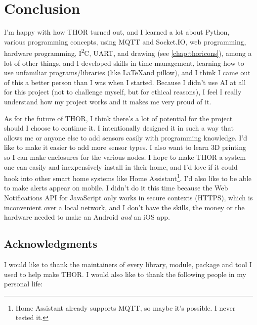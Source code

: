 \chapter{Conclusion}
I'm happy with how THOR turned out, and I learned a lot about Python, various programming concepts, using MQTT and Socket.IO, web programming, hardware programming, I\textsuperscript{2}C, UART, and drawing (see \autoref{chap:thoricons}), among a lot of other things, and I developed skills in time management, learning how to use unfamiliar programs/libraries (like \setmainfont{IBM Plex Serif}\LaTeX\setmainfont{IBM Plex Sans}\medspace and pillow), and I think I came out of this a better person than I was when I started. Because I didn't use AI at all for this project (not to challenge myself, but for ethical reasons), I feel I really understand how my project works and it makes me very proud of it.

As for the future of THOR, I think there's a lot of potential for the project should I choose to continue it. I intentionally designed it in such a way that allows me or anyone else to add sensors easily with programming knowledge. I'd like to make it easier to add more sensor types. I also want to learn 3D printing so I can make enclosures for the various nodes. I hope to make THOR a system one can easily and inexpensively install in their home, and I'd love if it could hook into other smart home systems like Home Assistant\footnote{Home Assistant already supports MQTT, so maybe it's  possible. I never tested it.}. I'd also like to be able to make alerts appear on mobile. I didn't do it this time because the Web Notifications API for JavaScript only works in secure contexts (HTTPS), which is inconvenient over a local network, and I don't have the skills, the money or the hardware needed to make an Android \textit{and} an iOS app.

\section{Acknowledgments}
I would like to thank the maintainers of every library, module, package and tool I used to help make THOR.
I would also like to thank the following people in my personal life:

